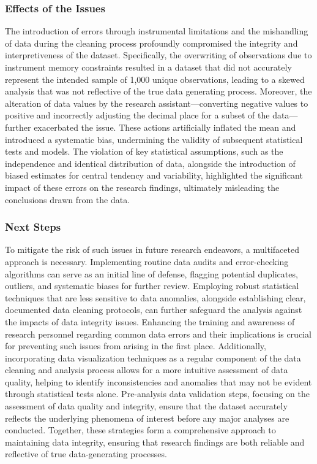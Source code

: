 \documentclass[
  letterpaper,
  DIV=11,
  numbers=noendperiod]{scrartcl}
\begin{document}
\subsubsection{Effects of the Issues}\label{effects-of-the-issues}

The introduction of errors through instrumental limitations and the
mishandling of data during the cleaning process profoundly compromised
the integrity and interpretiveness of the dataset. Specifically, the
overwriting of observations due to instrument memory constraints
resulted in a dataset that did not accurately represent the intended
sample of 1,000 unique observations, leading to a skewed analysis that
was not reflective of the true data generating process. Moreover, the
alteration of data values by the research assistant---converting
negative values to positive and incorrectly adjusting the decimal place
for a subset of the data---further exacerbated the issue. These actions
artificially inflated the mean and introduced a systematic bias,
undermining the validity of subsequent statistical tests and models. The
violation of key statistical assumptions, such as the independence and
identical distribution of data, alongside the introduction of biased
estimates for central tendency and variability, highlighted the
significant impact of these errors on the research findings, ultimately
misleading the conclusions drawn from the data.

\subsubsection{Next Steps}\label{next-steps}

To mitigate the risk of such issues in future research endeavors, a
multifaceted approach is necessary. Implementing routine data audits and
error-checking algorithms can serve as an initial line of defense,
flagging potential duplicates, outliers, and systematic biases for
further review. Employing robust statistical techniques that are less
sensitive to data anomalies, alongside establishing clear, documented
data cleaning protocols, can further safeguard the analysis against the
impacts of data integrity issues. Enhancing the training and awareness
of research personnel regarding common data errors and their
implications is crucial for preventing such issues from arising in the
first place. Additionally, incorporating data visualization techniques
as a regular component of the data cleaning and analysis process allows
for a more intuitive assessment of data quality, helping to identify
inconsistencies and anomalies that may not be evident through
statistical tests alone. Pre-analysis data validation steps, focusing on
the assessment of data quality and integrity, ensure that the dataset
accurately reflects the underlying phenomena of interest before any
major analyses are conducted. Together, these strategies form a
comprehensive approach to maintaining data integrity, ensuring that
research findings are both reliable and reflective of true
data-generating processes.
\end{document}
